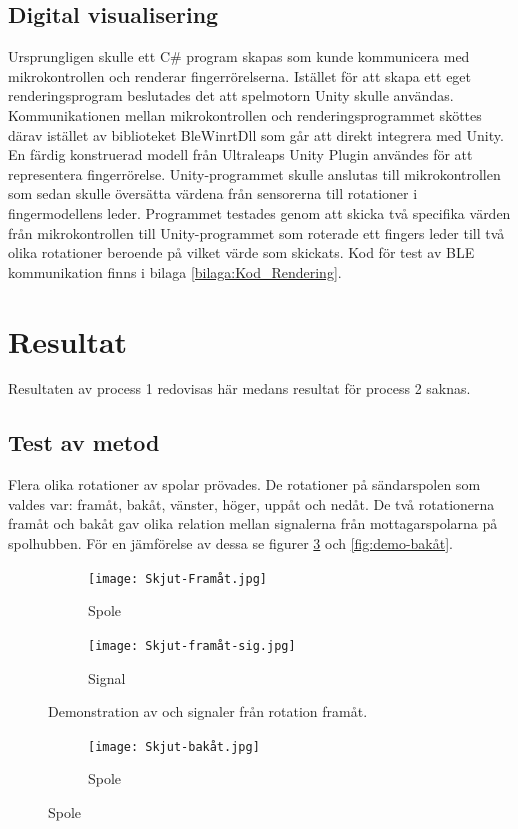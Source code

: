 \documentclass[a4paper]{article}
\begin{document}
\begin{sloppypar}
    \subsection{Digital visualisering}
    Ursprungligen skulle ett C\# program skapas som kunde kommunicera med mikrokontrollen och renderar fingerrörelserna.
    Istället för att skapa ett eget renderingsprogram beslutades det att spelmotorn Unity skulle användas.
    Kommunikationen mellan mikrokontrollen och renderingsprogrammet sköttes därav istället av biblioteket BleWinrtDll som går att direkt integrera med Unity.
    En färdig konstruerad modell från Ultraleaps Unity Plugin användes för att representera fingerrörelse.
    Unity-programmet skulle anslutas till mikrokontrollen som sedan skulle översätta värdena från sensorerna till rotationer i fingermodellens leder.
    Programmet testades genom att skicka två specifika värden från mikrokontrollen till Unity-programmet som roterade ett fingers leder till två olika rotationer beroende på vilket värde som skickats.
    Kod för test av BLE kommunikation finns i bilaga \ref{bilaga:Kod_Rendering}.


    \newpage
    \section{Resultat}
    Resultaten av process 1 redovisas här medans resultat för process 2 saknas.

    \subsection{Test av metod}
    Flera olika rotationer av spolar prövades. De rotationer på sändarspolen som valdes var: framåt, bakåt, vänster, höger, uppåt och nedåt.
    De två rotationerna framåt och bakåt gav  olika relation mellan signalerna från mottagarspolarna på spolhubben. För en jämförelse av dessa se figurer \ref{fig:demo-framåt} och \ref{fig:demo-bakåt}.

    \begin{figure}[H]
        \centering
        \begin{subfigure}[b]{0.45\textwidth}
            \centering
            \texttt{[image: Skjut-Framåt.jpg]}
            \caption{Spole}
            \label{fig:spole-framåt}

        \end{subfigure}
        \hfill
        \begin{subfigure}[b]{0.45\textwidth}
            \centering
            \texttt{[image: Skjut-framåt-sig.jpg]}
            \caption{Signal}
            \label{fig:signal-framåt}
        \end{subfigure}
        \caption{Demonstration av och signaler från rotation framåt.}
        \label{fig:demo-framåt}
    \end{figure}
    \begin{figure}[H]
        \centering
        \begin{subfigure}[b]{0.45\textwidth}
            \centering
            \texttt{[image: Skjut-bakåt.jpg]}
            \caption{Spole}
            \label{fig:spole-bakåt}


\end{subfigure}
\end{figure}
\end{sloppypar}
\end{document}
